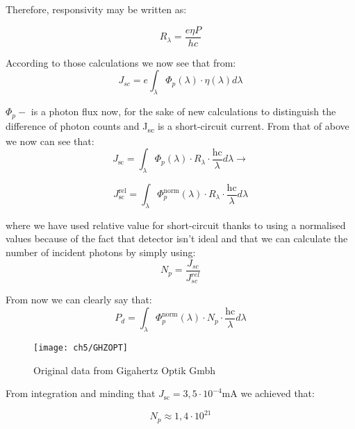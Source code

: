 \noindent Therefore, responsivity may be written as:

\begin{equation}
R_{\lambda} = \frac{e\eta P}{hc}
\end{equation}


\noindent According to those calculations we now see that from:
\begin{equation}
J_{sc} = e\int_{\lambda}^{}{\Phi_{p}(\lambda ) \cdot \eta (\lambda) d \lambda }
\end{equation}

\noindent \(\Phi_{p} -\) is a photon flux now, for the sake of new calculations to
distinguish the difference of photon counts and J­\textsubscript{sc} is
a short-circuit current. From that of above we now can see that:
\begin{equation}
J_{\text{sc}} = \int_{\lambda}^{}{\Phi_{p}\left( \lambda \right) \cdot R_{\lambda } \cdot \frac{\text{hc}}{\lambda }d\lambda } \rightarrow
\end{equation}

\begin{equation}
J_{\text{sc}}^{\text{rel}} = \int_{\lambda}^{}{\Phi_{p}^{\text{norm}}\left( \lambda \right) \cdot R_{\lambda} \cdot \frac{\text{hc}}{\lambda}d\lambda }
\end{equation}


\noindent where we have used relative value for short-circuit thanks to using a
normalised values because of the fact that detector isn't ideal and that
we can calculate the number of incident photons by simply using:
\begin{equation}
N_{p} = \frac{J_{sc}}{J_{sc}^{rel}}
\end{equation}

\noindent From now we can clearly say that:
\begin{equation}
P_{d} = \int_{\lambda}^{}{\Phi_{p}^{\text{norm}}\left( \lambda \right) \cdot N_{p} \cdot \frac{\text{hc}}{\lambda}d \lambda }
\end{equation}

\begin{figure}[H]
\center
\texttt{[image: ch5/GHZOPT]}
\caption{Original data from Gigahertz Optik Gmbh}
\end{figure}

\noindent From integration and minding that
\(J_{\text{sc}} = 3,5 \cdot 10^{- 4}\text{mA\ }\)we achieved that:

\[N_{p} \approx 1,4 \cdot 10^{21}\]

